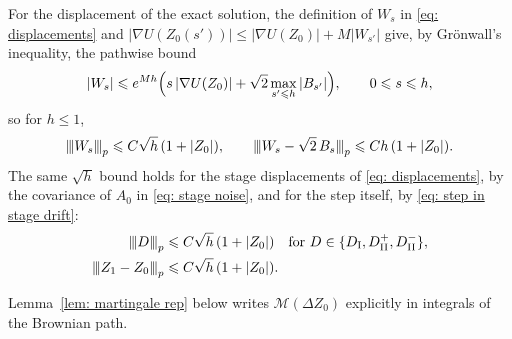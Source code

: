 \documentclass[namedate,webpdf,imanum]{ima-authoring-template}
\newcommand{\pnorm}[1]{{\vert\kern-0.25ex\vert\kern-0.25ex\vert} #1 {\vert\kern-0.25ex\vert\kern-0.25ex\vert}}
\newcommand{\Le}{\leqslant}
\theoremstyle{thmstyletwo}
\numberwithin{equation}{section}
\begin{document}
For the displacement of the exact solution, the definition of $W_s$ in \eqref{eq: displacements} and $|\nabla U(Z_0(s'))| \Le |\nabla U(Z_0)| + M |W_{s'}|$ give, by Gr\"onwall's inequality, the pathwise bound
\begin{equation*}
    |W_s| \Le e^{M h} \Bigl( s\, |\nabla U(Z_0)| + \sqrt2 \max_{s' \Le h} |B_{s'}| \Bigr) , \qquad 0 \Le s \Le h ,
\end{equation*}
so for $h \Le 1$,
\begin{equation}
    \pnorm{W_s}_p \Le C \sqrt h\, (1 + |Z_0|) , \qquad
    \pnorm{W_s - \sqrt2\, B_s}_p \Le C h\, (1 + |Z_0|) .
    \label{eq: displacement moments}
\end{equation}
The same $\sqrt h$ bound holds for the stage displacements of \eqref{eq: displacements}, by the covariance of $A_0$ in \eqref{eq: stage noise}, and for the step itself, by \eqref{eq: step in stage drift}:
\begin{align}
    \pnorm{D}_p & \Le C \sqrt h\, (1 + |Z_0|) \quad \text{for } D \in \{ D_{\mathrm I}, D_{\mathrm{II}}^{+}, D_{\mathrm{II}}^{-} \} , \notag \\
    \pnorm{Z_1 - Z_0}_p & \Le C \sqrt h\, (1 + |Z_0|) .
    \label{eq: stage moments}
\end{align}

Lemma~\ref{lem: martingale rep} below writes $\mathcal M(\Delta Z_0)$ explicitly in integrals of the Brownian path.
\end{document}
